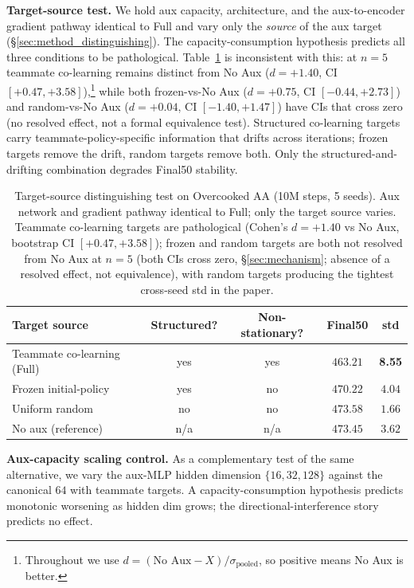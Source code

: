 \documentclass{article}
\theoremstyle{plain}
\theoremstyle{definition}
\theoremstyle{remark}
\begin{document}
\textbf{Target-source test.} We hold aux capacity, architecture, and
the aux-to-encoder gradient pathway identical to Full and vary only
the \emph{source} of the aux target (\S\ref{sec:method_distinguishing}).
The capacity-consumption hypothesis predicts all three conditions to
be pathological. Table~\ref{tab:target_source} is inconsistent with
this: at $n{=}5$ teammate co-learning remains distinct from No Aux
($d{=}+1.40$, CI $[{+}0.47,{+}3.58]$),\footnote{Throughout we use
$d = (\text{No Aux} - X) / \sigma_{\text{pooled}}$, so positive
means No Aux is better.} while both frozen-vs-No Aux ($d{=}+0.75$,
CI $[{-}0.44,{+}2.73]$) and random-vs-No Aux ($d{=}+0.04$, CI
$[{-}1.40,{+}1.47]$) have CIs that cross zero (no resolved effect,
not a formal equivalence test). Structured co-learning targets
carry teammate-policy-specific information that drifts across
iterations; frozen targets remove the drift, random targets remove
both. Only the structured-and-drifting combination degrades Final50
stability.

\begin{table}[t]
\centering
\caption{Target-source distinguishing test on Overcooked AA (10M steps, 5 seeds). Aux network and gradient pathway identical to Full; only the target source varies. Teammate co-learning targets are pathological (Cohen's $d = +1.40$ vs No Aux, bootstrap CI $[+0.47, +3.58]$); frozen and random targets are both not resolved from No Aux at $n{=}5$ (both CIs cross zero, \S\ref{sec:mechanism}; absence of a resolved effect, not equivalence), with random targets producing the tightest cross-seed std in the paper.}
\label{tab:target_source}
\small
\begin{tabular}{lcccc}
\toprule
\textbf{Target source} & \textbf{Structured?} & \textbf{Non-stationary?} & \textbf{Final50} & \textbf{std} \\
\midrule
Teammate co-learning (Full)        & yes & yes & $463.21$ & \textbf{8.55} \\
Frozen initial-policy              & yes & no  & $470.22$ & $4.04$ \\
Uniform random                     & no  & no  & $\mathbf{473.58}$ & $\mathbf{1.66}$ \\
\midrule
No aux (reference)                 & n/a & n/a & $473.45$ & $3.62$ \\
\bottomrule
\end{tabular}
\end{table}

\textbf{Aux-capacity scaling control.} As a complementary test of the
same alternative, we vary the aux-MLP hidden dimension
$\{16, 32, 128\}$ against the canonical $64$ with teammate targets.
A capacity-consumption hypothesis predicts monotonic worsening as
hidden dim grows; the directional-interference story predicts no
effect.
\end{document}
